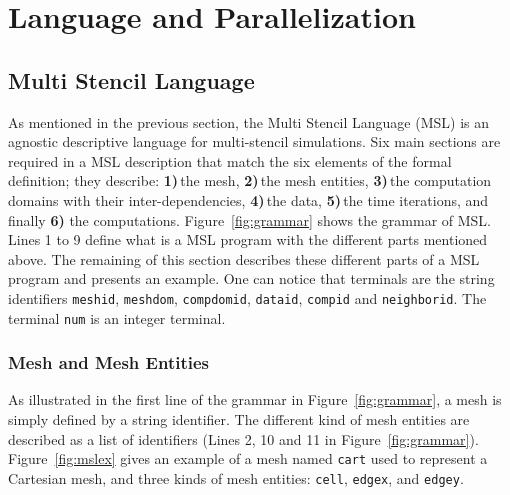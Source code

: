 \section{Language and Parallelization}
\label{sect:msmsc}
\subsection{Multi Stencil Language}

As mentioned in the previous section, the Multi Stencil Language (MSL) is an agnostic descriptive language for multi-stencil simulations. Six main sections are required in a MSL description that match the six elements of the formal definition; they describe: \textbf{1)}\,the mesh, \textbf{2)}\,the mesh entities, \textbf{3)}\,the computation domains with their inter-dependencies, \textbf{4)}\,the data, \textbf{5)}\,the time iterations, and finally \textbf{6)} the computations.
Figure~\ref{fig:grammar} shows the grammar of MSL. Lines 1 to 9 define what is a MSL program with the different parts mentioned above. The remaining of this section describes these different parts of a MSL program and presents an example.
One can notice that terminals are the string identifiers \texttt{meshid}, \texttt{meshdom}, \texttt{compdomid}, \texttt{dataid}, \texttt{compid} and \texttt{neighborid}. The terminal \texttt{num} is an integer terminal.

\subsubsection*{Mesh and Mesh Entities}
As illustrated in the first line of the grammar in Figure~\ref{fig:grammar}, a mesh is simply defined by a string identifier.
The different kind of mesh entities are described as a list of identifiers (Lines 2, 10 and 11 in Figure~\ref{fig:grammar}).
Figure~\ref{fig:mslex} gives an example of a mesh named \texttt{cart} used to represent a Cartesian mesh, and three kinds of mesh entities: \texttt{cell}, \texttt{edgex}, and \texttt{edgey}.

